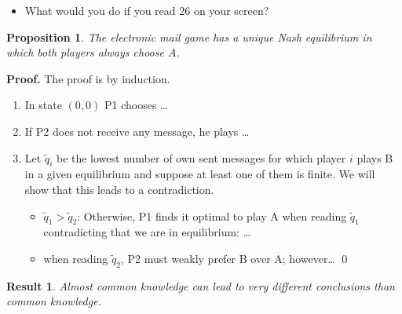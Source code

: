 \documentclass{beamer}    %
\theoremstyle{plain}
\newtheorem{prop}{Proposition}
\newtheorem{result}{Result}
\theoremstyle{definition}
\begin{document}
{\begin{itemize}
\item What would you do if you read 26 on your screen?
\end{itemize}

\framebreak

\begin{prop}
  The electronic mail game has a unique Nash equilibrium in which both players always choose $A$.
\end{prop}
\textbf{Proof. }The proof is by induction.\\
\begin{enumerate}
\item In state $(0,0)$ P1 chooses \dots %
\item If P2 does not receive any message, he plays \dots
\item Let $\tilde q_i$ be the lowest number of own sent messages for which player $i$ plays B in a given equilibrium and suppose at least one of them is finite. We will show that this leads to a contradiction. 
  \begin{itemize}
  \item $\tilde q_1> \tilde q_2$: Otherwise, P1 finds it optimal to play A when reading $\tilde q_1$ contradicting that we are in equilibrium: \dots%
  \item when reading $\tilde q_2$, P2 must weakly prefer B over A; however\dots%
\qed
  \end{itemize}
\end{enumerate}



\begin{result}
  Almost common knowledge can lead to very different conclusions than common knowledge.
\end{result}
}
\end{document}
